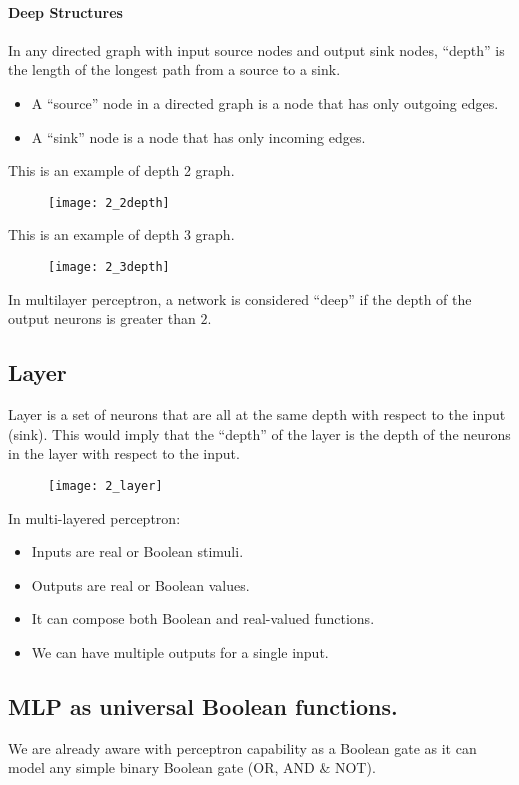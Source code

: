 \paragraph{Deep Structures}
In any directed graph with input source nodes and output sink nodes, ``depth'' is the length of the longest path from a source to a sink.
\begin{itemize}
	\item A ``source'' node in a directed graph is a node that has only outgoing edges.
	\item A ``sink'' node is a node that has only incoming edges.
\end{itemize}

\hfill\break
This is an example of depth 2 graph.
\begin{figure}[H]
	\centering
	\texttt{[image: 2\_2depth]}
\end{figure}

\hfill\break
This is an example of depth 3 graph.
\begin{figure}[H]
	\centering
	\texttt{[image: 2\_3depth]}
\end{figure}

\hfill\break
In multilayer perceptron, a network is considered ``deep'' if the depth of the output neurons is greater than $2$.

\subsection{Layer}
Layer is a set of neurons that are all at the same depth  with respect to the input (sink). This would imply that the ``depth'' of the layer is the depth of the neurons in the layer with respect to the input.

\begin{figure}[H]
	\centering
	\texttt{[image: 2\_layer]}
\end{figure}

\hfill\break
In multi-layered perceptron:
\begin{itemize}
	\item Inputs are real or Boolean stimuli.
	\item Outputs are real or Boolean values.
	\item It can compose both Boolean and real-valued functions.
	\item We can have multiple outputs for a single input.
\end{itemize}

\subsection{MLP as universal Boolean functions.}
We are already aware with perceptron capability as a Boolean gate as it can model any simple binary Boolean gate (OR, AND \& NOT).

